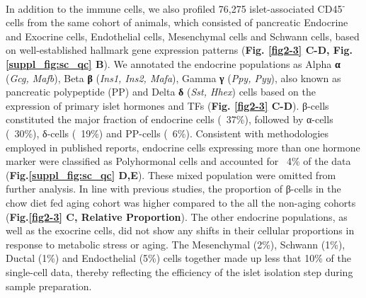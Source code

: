 In addition to the immune cells, we also profiled 76,275 islet-associated CD45\textsuperscript{-} cells from the same cohort of animals, which consisted of pancreatic Endocrine and Exocrine cells, Endothelial cells, Mesenchymal cells and Schwann cells, based on well-established hallmark gene expression patterns (\textbf{Fig. \ref{fig2-3} C-D, Fig.\ref{suppl_fig:sc_qc} B}). We annotated the endocrine populations as Alpha \textbf{α} (\textit{Gcg, Mafb}), Beta \textbf{β} (\textit{Ins1, Ins2, Mafa}), Gamma \textbf{γ} (\textit{Ppy, Pyy}), also known as pancreatic polypeptide (PP) and Delta \textbf{δ} (\textit{Sst, Hhex}) cells based on the expression of primary islet hormones and TFs (\textbf{Fig. \ref{fig2-3} C-D}). β-cells constituted the major fraction of endocrine cells (~37\%), followed by α-cells (~30\%), δ-cells (~19\%) and PP-cells (~6\%). Consistent with methodologies employed in published reports, endocrine cells expressing more than one hormone marker were classified as Polyhormonal cells and accounted for ~4\% of the data (\textbf{Fig.\ref{suppl_fig:sc_qc} D,E}). These mixed population were omitted from further analysis. In line with previous studies, the proportion of β-cells in the chow diet fed aging cohort was higher compared to the all the non-aging cohorts (\textbf{Fig.\ref{fig2-3} C, Relative Proportion}). The other endocrine populations, as well as the exocrine cells, did not show any shifts in their cellular proportions in response to metabolic stress or aging. The Mesenchymal (2\%), Schwann (1\%), Ductal (1\%) and Endocthelial (5\%) cells together made up less that 10\% of the single-cell data, thereby reflecting the efficiency of the islet isolation step during sample preparation. 

